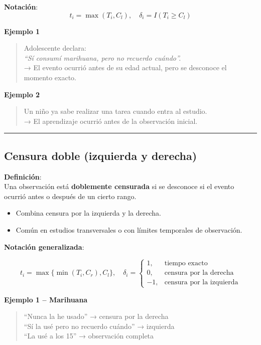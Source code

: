 \documentclass[
  letterpaper,
  DIV=11,
  numbers=noendperiod]{scrartcl}
\providecommand{\tightlist}{%
  \setlength{\itemsep}{0pt}\setlength{\parskip}{0pt}}
\begin{document}
\textbf{Notación}:\\
\[
t_i = \max(T_i, C_l), \quad 
\delta_i = I(T_i \ge C_l)
\]

\textbf{Ejemplo 1}

\begin{quote}
Adolescente declara:\\
\emph{``Sí consumí marihuana, pero no recuerdo cuándo''.}\\
→ El evento ocurrió antes de su edad actual, pero se desconoce el
momento exacto.
\end{quote}

\textbf{Ejemplo 2}

\begin{quote}
Un niño ya sabe realizar una tarea cuando entra al estudio.\\
→ El aprendizaje ocurrió antes de la observación inicial.
\end{quote}

\begin{center}\rule{0.5\linewidth}{0.5pt}\end{center}

\subsection{Censura doble (izquierda y
derecha)}\label{censura-doble-izquierda-y-derecha}

\textbf{Definición}:\\
Una observación está \textbf{doblemente censurada} si se desconoce si el
evento ocurrió antes o después de un cierto rango.

\begin{itemize}
\tightlist
\item
  Combina censura por la izquierda y la derecha.
\item
  Común en estudios transversales o con límites temporales de
  observación.
\end{itemize}

\textbf{Notación generalizada}:

\[
t_i = \max\{ \min(T_i, C_r), C_l \}, \quad
\delta_i =
\begin{cases}
1, & \text{tiempo exacto} \\
0, & \text{censura por la derecha} \\
-1, & \text{censura por la izquierda}
\end{cases}
\]

\textbf{Ejemplo 1 -- Marihuana}

\begin{quote}
``Nunca la he usado'' → censura por la derecha\\
``Sí la usé pero no recuerdo cuándo'' → izquierda\\
``La usé a los 15'' → observación completa
\end{quote}
\end{document}

